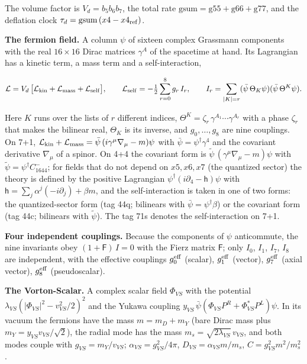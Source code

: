 \documentclass[
  10pt,
]{article}
\begin{document}
The volume factor is \(V_d=b_5b_6b_7\), the total rate
\(\mathrm{gsum}=\mathrm{g55}+\mathrm{g66}+\mathrm{g77}\), and the
deflation clock \(\tau_d=\mathrm{gsum}\,(x4-x4_{\rm ref})\).

\textbf{The fermion field.} A column \(\psi\) of sixteen complex
Grassmann components with the real \(16\times16\) Dirac matrices
\(\gamma^A\) of the spacetime at hand. Its Lagrangian has a kinetic
term, a mass term and a self-interaction,

\[\mathcal L=V_d\,\big[\mathcal L_{\rm kin}+\mathcal L_{\rm mass}+\mathcal L_{\rm self}\big],
\qquad\mathcal L_{\rm self}=-\tfrac12\sum_{r=0}^{8}g_r\,I_r,\qquad
I_r=\sum_{|K|=r}(\bar\psi\,\Theta_K\psi)(\bar\psi\,\Theta^K\psi).\]

Here \(K\) runs over the lists of \(r\) different indices,
\(\Theta^K=\zeta_r\,\gamma^{A_1}\cdots\gamma^{A_r}\) with a phase
\(\zeta_r\) that makes the bilinear real, \(\Theta_K\) is its inverse,
and \(g_0,\dots,g_8\) are nine couplings. On 7+1,
\(\mathcal L_{\rm kin}+\mathcal L_{\rm mass}=\bar\psi\,(i\gamma^\mu\nabla_\mu-m)\psi\)
with \(\bar\psi=\psi^\dagger\gamma^4\) and the covariant derivative
\(\nabla_\mu\) of a spinor. On 4+4 the covariant form is
\(\tilde\psi\,(\gamma^\mu\nabla_\mu-m)\psi\) with
\(\tilde\psi=\psi^\dagger C^-_{1644}\); for fields that do not depend on
\(x5,x6,x7\) (the quantized sector) the theory is defined by the
positive Lagrangian \(\psi^\dagger(i\partial_4-\mathsf h)\psi\) with
\(\mathsf h=\sum_j\alpha^j(-i\partial_j)+\beta m\), and the
self-interaction is taken in one of two forms: the quantized-sector form
(tag 44q; bilinears with \(\bar\psi=\psi^\dagger\beta\)) or the
covariant form (tag 44c; bilinears with \(\tilde\psi\)). The tag 71s
denotes the self-interaction on 7+1.

\textbf{Four independent couplings.} Because the components of \(\psi\)
anticommute, the nine invariants obey \((1+\mathsf F)\,I=0\) with the
Fierz matrix \(\mathsf F\); only \(I_0\), \(I_1\), \(I_7\), \(I_8\) are
independent, with the effective couplings \(g_0^{\rm eff}\) (scalar),
\(g_1^{\rm eff}\) (vector), \(g_7^{\rm eff}\) (axial vector),
\(g_8^{\rm eff}\) (pseudoscalar).

\textbf{The Vorton-Scalar.} A complex scalar field \(\Phi_{VS}\) with
the potential \(\lambda_{VS}(|\Phi_{VS}|^2-v_{VS}^2/2)^2\) and the
Yukawa coupling \(y_{VS}\,\bar\psi(\Phi_{VS}P^R+\Phi_{VS}^*P^L)\psi\).
In its vacuum the fermions have the mass \(m=m_D+m_Y\) (bare Dirac mass
plus \(m_Y=y_{VS}v_{VS}/\sqrt2\)), the radial mode has the mass
\(m_s=\sqrt{2\lambda_{VS}}\,v_{VS}\), and both modes couple with
\(g_{VS}=m_Y/v_{VS}\); \(\alpha_{VS}=g_{VS}^2/4\pi\),
\(D_{VS}=\alpha_{VS}m/m_s\), \(C=g_{VS}^2m^2/m_s^2\).
\end{document}
